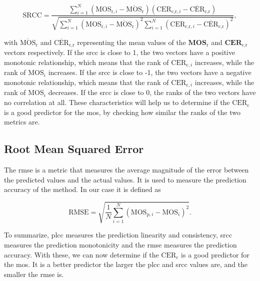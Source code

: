 \begin{equation}
    \text{SRCC} = \frac{\sum_{i=1}^{N}{(\text{MOS}_{\text{r},i}-\overline{\text{MOS}}_{\text{r}})(\text{CER}_{\text{c,r},i}-\overline{\text{CER}}_{\text{c,r}})}}{\sqrt{\sum_{i=1}^{N}{(\text{MOS}_{\text{r},i}-\overline{\text{MOS}}_{\text{r}})^2}\sum_{i=1}^{N}{(\text{CER}_{\text{c,r},i}-\overline{\text{CER}}_{\text{c,r}})^2}}},
    \label{eq:spearman}
\end{equation}

with $\overline{\text{MOS}}_{\text{r}}$ and $\overline{\text{CER}}_{\text{c,r}}$ representing the mean values of the $\mathbf{MOS}_{\text{r}}$ and $\mathbf{CER}_{\text{c,r}}$ vectors respectively.
If the \gls{srcc} is close to 1, the two vectors have a positive monotonic relationship, which means that the rank of $\text{CER}_{\text{c},i}$ increases, while the rank of $\text{MOS}_{i}$ increases.
If the \gls{srcc} is close to -1, the two vectors have a negative monotonic relationship, which means that the rank of $\text{CER}_{\text{c},i}$ increases, while the rank of $\text{MOS}_{i}$ decreases.
If the \gls{srcc} is close to 0, the ranks of the two vectors have no correlation at all.
These characteristics will help us to determine if the $\text{CER}_{\text{c}}$ is a good predictor for the \gls{mos}, by checking how similar the ranks of the two metrics are.


\subsection{Root Mean Squared Error}
\label{subsec:rmse}

The \gls{rmse} is a metric that measures the average magnitude of the error between the predicted values and the actual values.
It is used to measure the prediction accuracy of the method.
In our case it is defined as

\begin{equation}
    \text{RMSE} = \sqrt{\frac{1}{N}\sum_{i=1}^{N}{(\text{MOS}_{\text{p},i} - \text{MOS}_{i})^2}}.
    \label{eq:rmse}
\end{equation}

To summarize, \gls{plcc} measures the prediction linearity and consistency, \gls{srcc} measures the prediction monotonicity and the \gls{rmse} measures the prediction accuracy.
With these, we can now determine if the $\text{CER}_{\text{c}}$ is a good predictor for the \gls{mos}.
It is a better predictor the larger the \gls{plcc} and \gls{srcc} values are, and the smaller the \gls{rmse} is.


